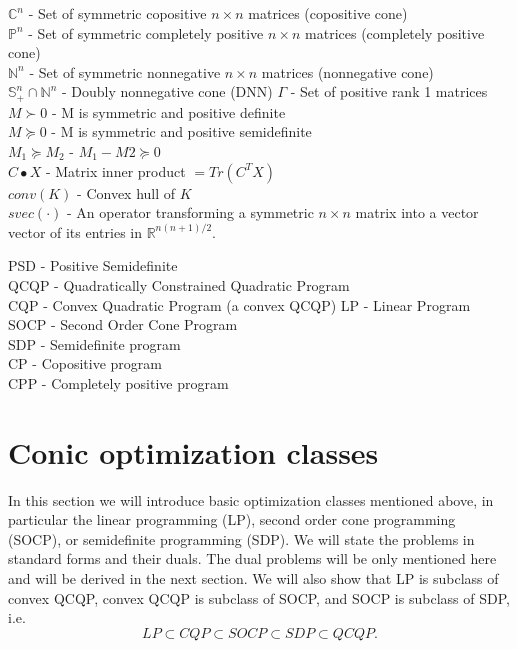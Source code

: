 \documentclass[12pt]{book}
\theoremstyle{definition}
\begin{document}
$\mathbb{C}^n$ - Set of symmetric copositive $n\times n$ matrices (copositive cone) \\
$\mathbb{P}^n$ - Set of symmetric completely positive $n\times n$ matrices (completely positive cone)\\
$\mathbb{N}^n$ - Set of symmetric nonnegative $n\times n$ matrices (nonnegative cone) \\
$\mathbb{S}^n_+ \cap \mathbb{N}^n$ - Doubly nonnegative cone (DNN)
$\Gamma $ - Set of positive rank 1 matrices\\


$M\succ 0$ - M is symmetric and positive definite \\
$M\succeq 0$ - M is symmetric and positive semidefinite \\
$M_1 \succeq M_2$ - $M_1 - M2\succeq 0$ \\
$C\bullet X$ - Matrix inner product $=Tr(C^TX)$ \\

$conv(K)$ - Convex hull of $K$ \\
$svec(\cdot)$ - An operator transforming a symmetric $n\times n$ matrix into a vector vector of its entries in $\mathbb{R}^{n(n+1)/2}$.


PSD - Positive Semidefinite \\

QCQP - Quadratically Constrained Quadratic Program \\
CQP - Convex Quadratic Program (a convex QCQP)
LP - Linear Program \\
SOCP - Second Order Cone Program \\
SDP - Semidefinite program \\
CP - Copositive program \\
CPP - Completely positive program \\






\chapter{Conic optimization classes}
\label{ConicOptClasses}

In this section we will introduce basic optimization classes mentioned above, in particular the  linear programming (LP), second order cone programming  (SOCP), or semidefinite programming (SDP). We will state the problems in standard forms and their duals. The dual problems will be only mentioned here and will be derived in the next section. We will also show that LP is subclass of convex QCQP, convex QCQP is subclass of SOCP, and SOCP is subclass of SDP, i.e.
\begin{equation}
LP\subset CQP \subset SOCP \subset SDP \subset QCQP .
\end{equation}
\end{document}
